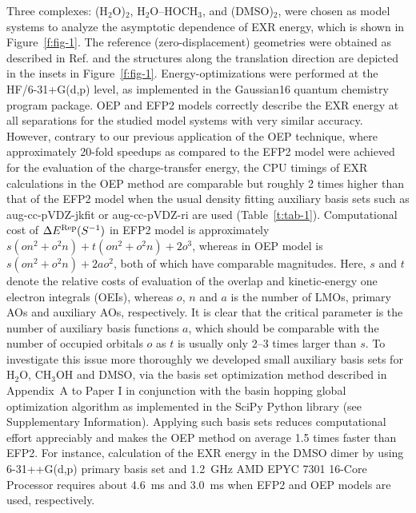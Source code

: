 Three complexes: 
(H$_2$O)$_2$, 
H$_2$O--HOCH$_3$, and
(DMSO)$_2$,
were chosen as model systems to analyze the asymptotic dependence 
of EXR energy, which is shown in Figure~\ref{f:fig-1}. 
The reference (zero\hyp{}displacement) geometries
were obtained as described in Ref.\cite{Blasiak.Bednarska.Choluj.Bartkowiak.JCP.2019} 
and the structures  
along the translation direction are depicted
in the insets in Figure~\ref{f:fig-1}.
Energy\hyp{}optimizations were performed at the HF/6-31+G(d,p) level,
as implemented in 
the {\sc Gaussian16} quantum chemistry program package.\cite{Gaussian16}
OEP and EFP2 models correctly describe the EXR energy at all separations
for the studied model systems with very similar accuracy. 
However,
contrary to our previous application of the OEP technique\cite{Blasiak.Bednarska.Choluj.Bartkowiak.JCP.2019},
where approximately 20\hyp{}fold speedups as compared to the EFP2 model were achieved
for the evaluation of the charge\hyp{}transfer energy,
the CPU timings of EXR calculations in the OEP method are comparable but roughly 2
times higher than that of the EFP2 model
when the usual density fitting auxiliary basis sets such as aug-cc-pVDZ-jkfit or aug-cc-pVDZ-ri are used
(Table~\ref{t:tab-1}).
Computational cost of $\Delta E^{\rm Rep}(S^{-1})$ in EFP2 model
is approximately $s(on^2 + o^2n) + t(on^2 + o^2n) + 2o^3$, whereas in OEP model
is $s(on^2 + o^2n) + 2ao^2$, both of which have comparable magnitudes. 
Here, $s$ and $t$ denote the relative costs of evaluation of the overlap
and kinetic-energy one electron integrals (OEIs), whereas $o$, $n$ and $a$ is
the number of LMOs, primary AOs and auxiliary AOs, respectively.
It is clear that the critical parameter is the number of auxiliary basis functions $a$,
which should be comparable with the number of occupied orbitals $o$ 
as $t$ is usually only 2--3 times larger than $s$.
To investigate this issue more thoroughly we developed small auxiliary basis sets for H$_2$O, CH$_3$OH and DMSO, 
via the basis set optimization method described in Appendix~A to Paper I
in conjunction with the basin hopping global optimization algorithm\cite{Wales.EnergyLandscapes.2003,
Wales.Scheraga.Science.1999,
Wales.Doye.JPCA.1997,Li.Scheraga.PNAS.1987}
as implemented in the SciPy Python library\cite{SciPy.2019}
(see Supplementary Information).
Applying such basis sets
reduces computational effort appreciably and makes the OEP method on average 1.5 times faster than EFP2.
For instance, calculation of the EXR energy in the DMSO dimer by using 6-31++G(d,p) primary
basis set and 
1.2~GHz AMD EPYC\texttrademark{} 7301 16-Core Processor
requires about 4.6~ms and 3.0~ms when EFP2 and OEP models are used, respectively.

